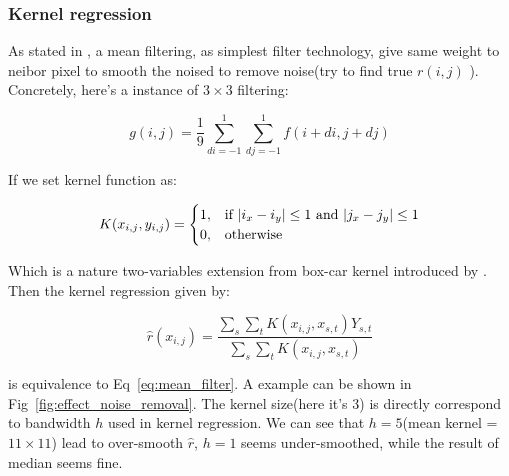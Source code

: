 \documentclass{beamer}
\begin{document}
\begin{frame}

    \frametitle{Kernel regression}

    As stated in \cite{solomon2011fundamentals}, a mean filtering, as simplest filter technology, give same weight to neibor pixel to smooth the
    noised to remove noise(try to find true $r(i,j)$ ). Concretely, here's a instance of $3 \times 3$ filtering:
    
    \begin{equation}
    g(i,j) = \frac{1}{9} \sum_{di=-1}^1 \sum_{dj=-1}^1 f(i+di,j+dj)
    \label{eq:mean_filter}
    \end{equation}
    
    If we set kernel function as:
    
    $$ 
    K(x_{i,j},y_{i,j}) =  
    \begin{cases}
      1, & \text{if $ |i_x - i_y| \le 1$ and $|j_x - j_y| \le 1$} \\
      0, & \text{otherwise}
    \end{cases}
    $$
    
    Which is a nature two-variables extension from box-car kernel introduced by \cite{wasserman2006all}.
    Then the kernel regression given by:
    
    $$
    \hat{r}(x_{i,j}) = \frac{\sum_{s} \sum_{t} K(x_{i,j},x_{s,t}) Y_{s,t}}{\sum_{s} \sum_{t} K(x_{i,j},x_{s,t})}
    $$
    
    is equivalence to Eq~\ref{eq:mean_filter}. A example can be shown in Fig~\ref{fig:effect_noise_removal}. 
    The kernel size(here it's $3$) is directly correspond to bandwidth $h$ used in kernel regression. 
    We can see that $h=5$(mean kernel = $11 \times 11 $) lead to over-smooth $\hat{r}$, $h=1$ seems under-smoothed,
    while the result of median seems fine.
    
\end{frame}
\end{document}
